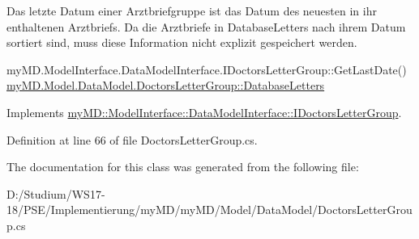 Das letzte Datum einer Arztbriefgruppe ist das Datum des neuesten in ihr enthaltenen Arztbriefs. Da die Arztbriefe in Database\-Letters nach ihrem Datum sortiert sind, muss diese Information nicht explizit gespeichert werden. 

my\-MD.Model\-Interface.Data\-Model\-Interface.IDoctors\-Letter\-Group::Get\-Last\-Date() \hyperlink{classmy_m_d_1_1_model_1_1_data_model_1_1_doctors_letter_group_df84ceb32ca80cc7fb3907b660899e4b}{my\-MD.Model.Data\-Model.Doctors\-Letter\-Group::Database\-Letters} 

Implements \hyperlink{interfacemy_m_d_1_1_model_interface_1_1_data_model_interface_1_1_i_doctors_letter_group_60f35d38f828e2c77f5243ebabc0e64b}{my\-MD::Model\-Interface::Data\-Model\-Interface::IDoctors\-Letter\-Group}.

Definition at line 66 of file Doctors\-Letter\-Group.cs.

The documentation for this class was generated from the following file:\begin{CompactItemize}
\item 
D:/Studium/WS17-18/PSE/Implementierung/my\-MD/my\-MD/Model/Data\-Model/Doctors\-Letter\-Group.cs\end{CompactItemize}
